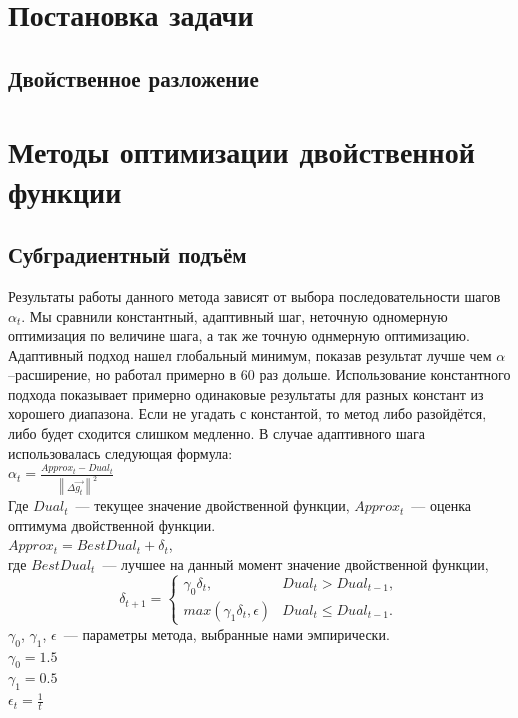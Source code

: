 \documentclass{article}
\begin{document}
\section{Постановка задачи}

\subsection{Двойственное разложение}



\section{Методы оптимизации двойственной функции}
\subsection{Субградиентный подъём}
Результаты работы данного метода зависят от выбора
последовательности шагов $\alpha_t$.
Мы сравнили константный, адаптивный шаг, неточную
одномерную оптимизация по величине шага, а так же
точную однмерную оптимизацию.\\
Адаптивный подход нашел глобальный минимум,
показав результат лучше чем $\alpha$--расширение,
но работал примерно в $60$ раз дольше.
Использование константного подхода показывает
примерно одинаковые результаты для разных констант
из хорошего диапазона. Если не угадать с константой,
то метод либо разойдётся, либо будет сходится слишком медленно.
В случае адаптивного шага использовалась следующая формула:\\
$\alpha_t = \frac{Approx_t - Dual_t}{\left \| \Delta \overrightarrow{g_t} \right \|^2}$\\
Где $Dual_t$~--- текущее значение двойственной функции, 
$Approx_t$~--- оценка оптимума двойственной функции.\\
$Approx_t = BestDual_t + \delta_t$,\\
где $BestDual_t$~--- лучшее на данный момент значение двойственной функции,\\
\begin{equation}
    \delta_{t+1} = \begin{cases}
    \gamma_0 \delta_t, & Dual_t > Dual_{t-1},\\
    max(\gamma_1 \delta_t, \epsilon) & Dual_t \leqslant  Dual_{t-1}.
    \end{cases}
\end{equation}
$\gamma_0$, $\gamma_1$, $\epsilon$~--- параметры метода, выбранные нами эмпирически.\\
$\gamma_0 = 1.5$\\
$\gamma_1 = 0.5$\\
$\epsilon_t = \frac{1}{t}$\\
\end{document}
